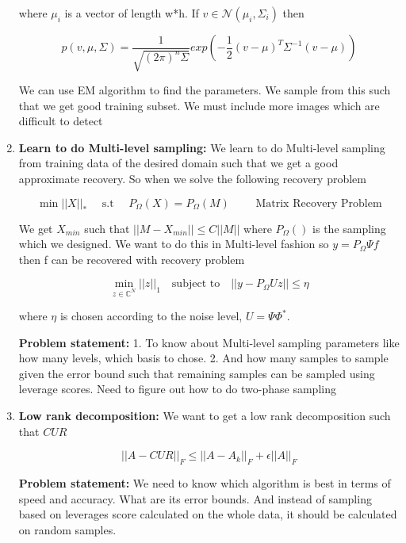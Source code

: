 \documentclass{article}
\begin{document}
\begin{enumerate}
    where $\mu_{i}$ is a vector of length w*h. If $v \in \mathcal{N}(\mu_{i},\Sigma_{i})$ then 
    
    \begin{equation}
        p(v,\mu,\Sigma) = \frac{1}{\sqrt{(2\pi)^{n}\Sigma}}exp(-\frac{1}{2}(v-\mu)^T\Sigma^{-1}(v-\mu)) 
    \end{equation}
    
     We can use EM algorithm to find the parameters. We sample from this such that we get good training subset. We must include more images which are difficult to detect 
    
    \item \textbf{Learn to do Multi-level sampling:} We learn to do Multi-level sampling from training data of the desired domain such that we get a good approximate recovery. So when we solve the following recovery problem
    
    \begin{equation}
        \min ||X||_{*} \quad \text{ s.t } \quad P_{\Omega}(X) = P_{\Omega}(M) \quad \quad \text{ Matrix Recovery Problem}
    \end{equation}
    
    We get $X_{min}$ such that $||M-X_{min}|| \leq C||M||$ where $P_{\Omega}()$ is   the sampling which we designed. We want to do this in Multi-level fashion so $y = P_{\Omega} \Psi f$ then f can be recovered with recovery problem 
    
    \begin{equation*}
        \min_{z \in \mathbb{C}^N} ||z||_{1} \quad \text{subject to} \quad ||y - P_{\Omega} U z|| \leq \eta
    \end{equation*}
    
    where $\eta$ is chosen according to the noise level, $U = \Psi \Phi^*$. 
    
    \textbf{Problem statement:} 1. To know about Multi-level sampling parameters like how many levels, which basis to chose.
    2. And how many samples to sample given the error bound such that remaining samples can be sampled using leverage scores. Need to figure out how to do two-phase sampling
    

    \item \textbf{Low rank decomposition:} We want to get a low rank decomposition such that $CUR$
    
    \begin{equation}
        ||A-CUR||_{F} \leq ||A-A_{k}||_{F} + \epsilon ||A||_{F}
    \end{equation}
    
    \textbf{Problem statement:} We need to know which algorithm is best in terms of speed and accuracy. What are its error bounds. And instead of sampling based on leverages score calculated on the whole data, it should be calculated on random samples.
    
\end{enumerate}
\end{document}
